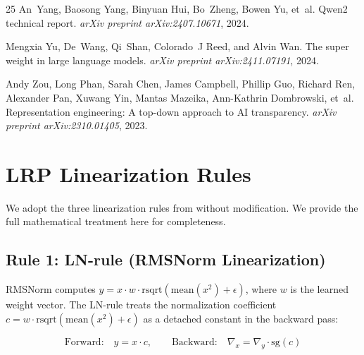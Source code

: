 \documentclass[11pt]{article}
\begin{document}
\begin{thebibliography}{25}
An~Yang, Baosong Yang, Binyuan Hui, Bo~Zheng, Bowen Yu, et~al.
\newblock Qwen2 technical report.
\newblock \emph{arXiv preprint arXiv:2407.10671}, 2024.

Mengxia Yu, De~Wang, Qi~Shan, Colorado~J Reed, and Alvin Wan.
\newblock The super weight in large language models.
\newblock \emph{arXiv preprint arXiv:2411.07191}, 2024.

Andy Zou, Long Phan, Sarah Chen, James Campbell, Phillip Guo, Richard Ren,
  Alexander Pan, Xuwang Yin, Mantas Mazeika, Ann-Kathrin Dombrowski, et~al.
\newblock Representation engineering: A top-down approach to {AI} transparency.
\newblock \emph{arXiv preprint arXiv:2310.01405}, 2023.

\end{thebibliography}


\newpage

\appendix

\section{LRP Linearization Rules}
\label{sec:lrp_appendix}

We adopt the three linearization rules from \citet{arora2025circuits} without modification.
We provide the full mathematical treatment here for completeness.

\subsection{Rule 1: LN-rule (RMSNorm Linearization)}

RMSNorm computes $y = x \cdot w \cdot \text{rsqrt}(\text{mean}(x^2) + \epsilon)$, where $w$ is the learned weight vector.
The LN-rule treats the normalization coefficient $c = w \cdot \text{rsqrt}(\text{mean}(x^2) + \epsilon)$ as a detached constant in the backward pass:

\begin{equation}
    \text{Forward:} \quad y = x \cdot c, \qquad
    \text{Backward:} \quad \nabla_x = \nabla_y \cdot \text{sg}(c)
\label{eq:ln_rule}
\end{equation}
\end{document}
